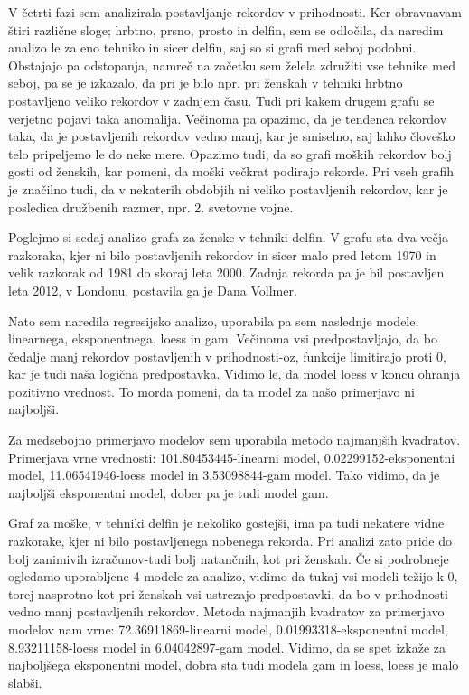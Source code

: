 \documentclass[11pt,a4paper]{article}
\begin{document}
V četrti fazi sem analizirala postavljanje rekordov v prihodnosti. Ker obravnavam štiri različne sloge; hrbtno, prsno, prosto in delfin, sem se odločila, da naredim analizo le za eno tehniko in sicer delfin, saj so si grafi med seboj podobni. Obstajajo pa odstopanja, namreč na začetku sem želela združiti vse tehnike med seboj, pa se je izkazalo, da pri je bilo npr. pri ženskah v tehniki hrbtno postavljeno veliko rekordov v zadnjem času. Tudi pri kakem drugem grafu se verjetno pojavi taka anomalija. Večinoma pa opazimo, da je tendenca rekordov taka, da je postavljenih rekordov vedno manj, kar je smiselno, saj lahko človeško telo pripeljemo le do neke mere. Opazimo tudi, da so grafi moških rekordov bolj gosti od ženskih, kar pomeni, da moški večkrat podirajo rekorde. Pri vseh grafih je značilno tudi, da v nekaterih obdobjih ni veliko postavljenih rekordov, kar je posledica družbenih razmer, npr. 2. svetovne vojne.

Poglejmo si sedaj analizo grafa za ženske v tehniki delfin. V grafu sta dva večja razkoraka, kjer ni bilo postavljenih rekordov in sicer malo pred letom 1970 in velik razkorak od 1981 do skoraj leta 2000. Zadnja rekorda pa je bil postavljen leta 2012, v Londonu, postavila ga je Dana Vollmer.

Nato sem naredila regresijsko analizo, uporabila pa sem naslednje modele; linearnega, eksponentnega, loess in gam. Večinoma vsi predpostavljajo, da bo čedalje manj rekordov postavljenih v prihodnosti-oz, funkcije limitirajo proti 0, kar je tudi naša logična predpostavka. Vidimo le, da model loess v koncu ohranja pozitivno vrednost. To morda pomeni, da ta model za našo primerjavo ni najboljši. 

Za medsebojno primerjavo modelov sem uporabila metodo najmanjših kvadratov. Primerjava vrne vrednosti: 101.80453445-linearni model, 0.02299152-eksponentni model,  11.06541946-loess model in  3.53098844-gam model. Tako vidimo, da je najboljši eksponentni model, dober pa je tudi model gam.


Graf za moške, v tehniki delfin je nekoliko gostejši, ima pa tudi nekatere vidne razkorake, kjer ni bilo postavljenega nobenega rekorda. Pri analizi zato pride do bolj zanimivih izračunov-tudi bolj natančnih, kot pri ženskah. Če si podrobneje ogledamo uporabljene 4 modele za analizo, vidimo da tukaj vsi modeli težijo k 0, torej nasprotno kot pri ženskah vsi ustrezajo predpostavki, da bo v prihodnosti vedno manj postavljenih rekordov. Metoda najmanjih kvadratov za primerjavo modelov nam vrne: 72.36911869-linearni model,  0.01993318-eksponentni model,  8.93211158-loess model in 6.04042897-gam model. Vidimo, da se spet izkaže za najboljšega eksponentni model, dobra sta tudi modela gam in loess, loess je malo slabši. 
\end{document}
